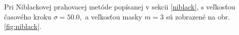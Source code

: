\documentclass[a4paper,11pt,oneside]{article}%
\begin{document}
Pri Niblackovej prahovacej metóde popísanej v sekcii \ref{niblack}, s veľkosťou časového kroku $\sigma = 50.0,$ a veľkosťou masky $m = 3$ sú zobrazené na obr. \ref{fig:niblack}. 

\begin{figure}[H]  
    \hspace{5px}

\end{figure}
\end{document}

